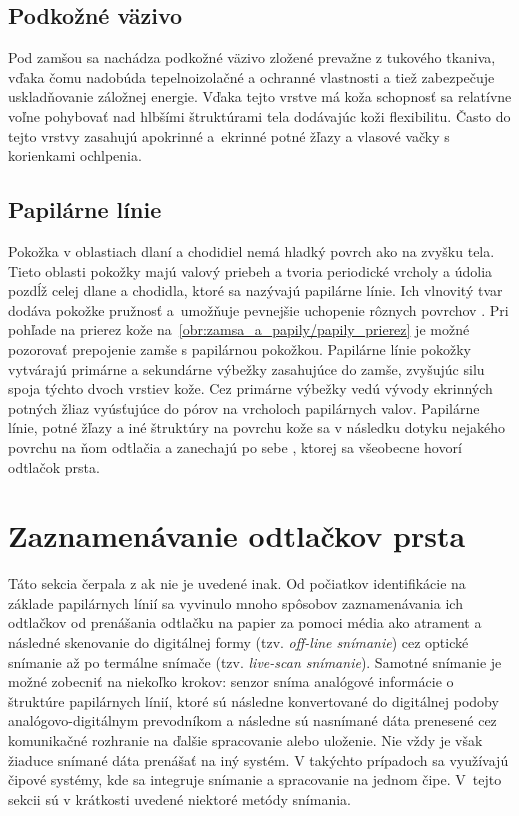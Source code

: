   \subsection{Podkožné väzivo}
  Pod zamšou sa nachádza podkožné väzivo zložené prevažne z tukového tkaniva, vďaka čomu nadobúda tepelnoizolačné a ochranné vlastnosti a tiež zabezpečuje
  uskladňovanie záložnej energie. Vďaka tejto vrstve má koža schopnosť sa relatívne voľne pohybovať nad hlbšími štruktúrami tela dodávajúc koži flexibilitu.
  Často do tejto vrstvy zasahujú apokrinné a~ekrinné potné žľazy a vlasové vačky s korienkami ochlpenia.

  \subsection{Papilárne línie}
  Pokožka v oblastiach dlaní a chodidiel nemá hladký povrch ako na zvyšku tela. Tieto oblasti pokožky majú valový priebeh a tvoria periodické vrcholy
  a údolia pozdĺž celej dlane a chodidla, ktoré sa nazývajú papilárne línie. Ich vlnovitý tvar dodáva pokožke pružnosť a~umožňuje pevnejšie
  uchopenie rôznych povrchov \cite{FingerprintSrcBook}.
  Pri pohľade na prierez kože na~{\ref{obr:zamsa_a_papily/papily_prierez}} je možné pozorovať prepojenie zamše s papilárnou pokožkou.
  Papilárne línie pokožky vytvárajú primárne a sekundárne výbežky zasahujúce do zamše, zvyšujúc silu spoja týchto dvoch vrstiev kože. Cez primárne výbežky
  vedú vývody ekrinných potných žliaz vyúsťujúce do pórov na vrcholoch papilárnych valov. Papilárne línie, potné žľazy
  a iné štruktúry na povrchu kože sa v následku dotyku nejakého povrchu na ňom odtlačia a zanechajú po sebe ,
  ktorej sa všeobecne hovorí odtlačok prsta.

  \section{Zaznamenávanie odtlačkov prsta}
  Táto sekcia čerpala z \cite{Handbook} ak nie je uvedené inak.
  Od počiatkov identifikácie na základe papilárnych línií sa vyvinulo mnoho spôsobov zaznamenávania ich odtlačkov od prenášania odtlačku na papier
  za pomoci média ako atrament a následné skenovanie do digitálnej formy (tzv. \emph{off-line snímanie}) cez optické snímanie až po termálne snímače
  (tzv. \emph{live-scan snímanie}). Samotné snímanie je možné zobecniť na niekoľko krokov: senzor sníma analógové informácie o štruktúre papilárnych línií,
  ktoré sú následne konvertované do digitálnej podoby analógovo-digitálnym prevodníkom a následne sú nasnímané dáta prenesené cez komunikačné rozhranie
  na ďalšie spracovanie alebo uloženie. Nie vždy je však žiaduce snímané dáta prenášať na iný systém. V takýchto prípadoch sa využívajú čipové systémy,
  kde sa integruje snímanie a spracovanie na jednom čipe.
  V~tejto sekcii sú v krátkosti uvedené niektoré metódy snímania.

